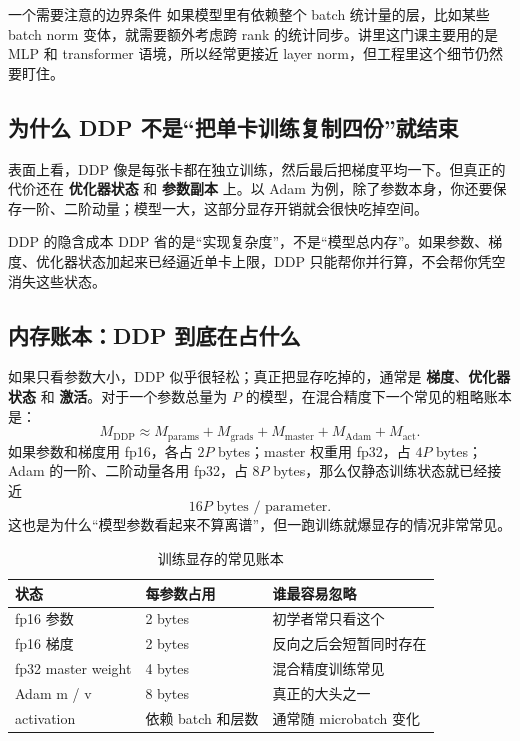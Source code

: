 \documentclass[a4paper]{article}
\begin{document}
\begin{warningbox}{一个需要注意的边界条件}
如果模型里有依赖整个 batch 统计量的层，比如某些 batch norm 变体，就需要额外考虑跨 rank 的统计同步。讲里这门课主要用的是 MLP 和 transformer 语境，所以经常更接近 layer norm，但工程里这个细节仍然要盯住。
\end{warningbox}

\subsection{为什么 DDP 不是“把单卡训练复制四份”就结束}

表面上看，DDP 像是每张卡都在独立训练，然后最后把梯度平均一下。但真正的代价还在 \textbf{优化器状态} 和 \textbf{参数副本} 上。以 Adam 为例，除了参数本身，你还要保存一阶、二阶动量；模型一大，这部分显存开销就会很快吃掉空间。

\begin{knowledgebox}{DDP 的隐含成本}
DDP 省的是“实现复杂度”，不是“模型总内存”。如果参数、梯度、优化器状态加起来已经逼近单卡上限，DDP 只能帮你并行算，不会帮你凭空消失这些状态。
\end{knowledgebox}

\subsection{内存账本：DDP 到底在占什么}

如果只看参数大小，DDP 似乎很轻松；真正把显存吃掉的，通常是 \textbf{梯度}、\textbf{优化器状态} 和 \textbf{激活}。对于一个参数总量为 $P$ 的模型，在混合精度下一个常见的粗略账本是：
\[
M_{\text{DDP}} \approx M_{\text{params}} + M_{\text{grads}} + M_{\text{master}} + M_{\text{Adam}} + M_{\text{act}}.
\]
如果参数和梯度用 fp16，各占 $2P$ bytes；master 权重用 fp32，占 $4P$ bytes；Adam 的一阶、二阶动量各用 fp32，占 $8P$ bytes，那么仅静态训练状态就已经接近
\[
16P \text{ bytes / parameter}.
\]
这也是为什么“模型参数看起来不算离谱”，但一跑训练就爆显存的情况非常常见。

\begin{table}[H]
\centering
\small
\begin{tabular}{p{3.4cm}p{3.6cm}p{4.4cm}}
\toprule
\textbf{状态} & \textbf{每参数占用} & \textbf{谁最容易忽略} \\
\midrule
fp16 参数 & 2 bytes & 初学者常只看这个 \\
fp16 梯度 & 2 bytes & 反向之后会短暂同时存在 \\
fp32 master weight & 4 bytes & 混合精度训练常见 \\
Adam m / v & 8 bytes & 真正的大头之一 \\
activation & 依赖 batch 和层数 & 通常随 microbatch 变化 \\
\bottomrule
\end{tabular}
\caption{训练显存的常见账本}
\end{table}
\end{document}
